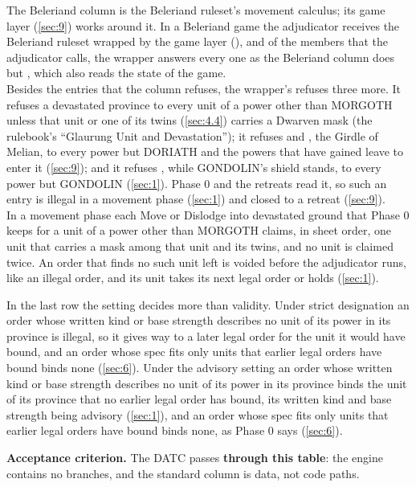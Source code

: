 \documentclass[12pt,a4paper]{article}
\begin{document}
The Beleriand column is the Beleriand ruleset's movement calculus; its game layer (\cref{sec:9}) works around it.
In a Beleriand game the adjudicator receives the Beleriand ruleset wrapped by the game layer (), and of the members that the adjudicator calls, the wrapper answers every one as the Beleriand column does but , which also reads the state of the game.\\
Besides the entries that the column refuses, the wrapper's  refuses three more.
It refuses a devastated province to every unit of a power other than MORGOTH unless that unit or one of its twins (\cref{sec:4.4}) carries a Dwarven mask (the rulebook's ``Glaurung Unit and Devastation''); it refuses  and , the Girdle of Melian, to every power but DORIATH and the powers that have gained leave to enter it (\cref{sec:9}); and it refuses , while GONDOLIN's shield stands, to every power but GONDOLIN (\cref{sec:1}).
Phase 0 and the retreats read it, so such an entry is illegal in a movement phase (\cref{sec:1}) and closed to a retreat (\cref{sec:9}).\\
In a movement phase each Move or Dislodge into devastated ground that Phase 0 keeps for a unit of a power other than MORGOTH claims, in sheet order, one unit that carries a mask among that unit and its twins, and no unit is claimed twice.
An order that finds no such unit left is voided before the adjudicator runs, like an illegal order, and its unit takes its next legal order or holds (\cref{sec:1}).

In the last row the setting decides more than validity.
Under strict designation an order whose written kind or base strength describes no unit of its power in its province is illegal, so it gives way to a later legal order for the unit it would have bound, and an order whose spec fits only units that earlier legal orders have bound binds none (\cref{sec:6}).
Under the advisory setting an order whose written kind or base strength describes no unit of its power in its province binds the unit of its province that no earlier legal order has bound, its written kind and base strength being advisory (\cref{sec:1}), and an order whose spec fits only units that earlier legal orders have bound binds none, as Phase 0 says (\cref{sec:6}).

\textbf{Acceptance criterion.}
The DATC passes \textbf{through this table}: the engine contains no  branches, and the standard column is data, not code paths.
\end{document}
